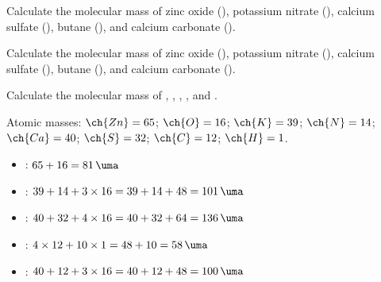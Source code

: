 \begin{exercise}
    Calculate the molecular mass of zinc oxide (), potassium nitrate (), calcium sulfate (), butane (), and calcium carbonate ().
    \begin{solu}
        Calculate the molecular mass of zinc oxide (), potassium nitrate (), calcium sulfate (), butane (), and calcium carbonate ().

        Calculate the molecular mass of , , , , and .

        Atomic masses: \( \ch{Zn} = 65 \); \( \ch{O} = 16 \); \( \ch{K} = 39 \); \( \ch{N} = 14 \); \( \ch{Ca} = 40 \); \( \ch{S} = 32 \); \( \ch{C} = 12 \); \( \ch{H} = 1 \).
        \begin{itemize}
            \item {}: \( 65 + 16 = \qty{81}{\uma} \)
            \item {}: \( 39 + 14 + 3 \times 16 = 39 + 14 + 48 = \qty{101}{\uma} \)
            \item {}: \( 40 + 32 + 4 \times 16 = 40 + 32 + 64 = \qty{136}{\uma} \)
            \item {}: \( 4 \times 12 + 10 \times 1 = 48 + 10 = \qty{58}{\uma} \)
            \item {}: \( 40 + 12 + 3 \times 16 = 40 + 12 + 48 = \qty{100}{\uma} \)
        \end{itemize}
    \end{solu}
\end{exercise}

